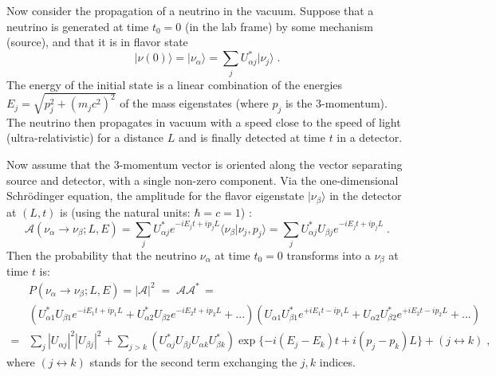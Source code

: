 Now consider the propagation of a neutrino in the vacuum. Suppose that a neutrino is generated at time $t_0=0$ (in the lab frame) by some mechanism (source), and that it is in flavor state
\begin{equation}
|\nu(0) \rangle = |\nu_\alpha \rangle = \sum_j U^*_{\alpha j}|\nu_j \rangle \;.
\end{equation}
The energy of the initial state is a linear combination of the energies $E_j=\sqrt{p_j^2 + (m_j c^2)^2}$ of the mass eigenstates (where $p_j$ is the 3-momentum). The neutrino then propagates in vacuum with a speed close to the speed of light (ultra-relativistic) for a distance $L$ and is finally detected at time $t$ in a detector.

Now assume that the 3-momentum vector is oriented along the vector separating source and detector, with a single non-zero component. Via the one-dimensional Schr\"{o}dinger equation, the amplitude for the flavor eigenstate $|\nu_\beta\rangle$ in the detector at $(L,t)$ is (using the natural units: $\hbar=c=1$) \cite{aitchison2012gauge}:
\begin{equation}
\mathcal{A}(\nu_\alpha\to\nu_\beta;L,E)=\sum_{j}U^*_{\alpha j}e^{-i E_j t+i p_j L}\langle\nu_\beta|\nu_j,p_j\rangle=\sum_{j}U^*_{\alpha j}U_{\beta j}e^{-iE_jt+ip_jL} \; .
\end{equation}
Then the probability that the neutrino $\nu_\alpha$ at time $t_0=0$ transforms into a $\nu_\beta$ at time $t$ is:
\begin{equation}\label{oscillationEq1}
 \begin{split}
&P(\nu_\alpha\to\nu_\beta;L,E)= |\mathcal{A}|^2 \; = \; \mathcal{A} \mathcal{A}^* \, =  \\%
&(U^*_{\alpha 1}U_{\beta 1}e^{-iE_1t+ip_1L}+U^*_{\alpha 2}U_{\beta 2}e^{-iE_2t+ip_2L}+...)(U_{\alpha 1}U^*_{\beta 1}e^{+iE_1t-ip_1L}+U_{\alpha 2}U^*_{\beta 2}e^{+iE_2t-ip_2L}+...)\\=
&\sum_j |U_{\alpha j}|^2|U_{\beta j}|^2 + \sum_{j>k}(U^*_{\alpha j}U_{\beta j}U_{\alpha k}U^*_{\beta k})\exp\{-i(E_j-E_k)t+i(p_j-p_k)L\}+(j\leftrightarrow k)\;,
\end{split}
\end{equation}
where $(j\leftrightarrow k)$ stands for the second term exchanging the $j,k$ indices.

